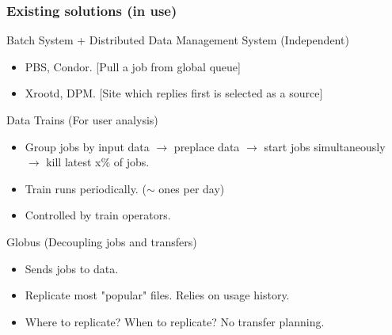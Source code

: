 \documentclass{beamer}
\begin{document}
\begin{frame}\frametitle{Existing solutions (in use)} 	
\begin{block}{Batch System + Distributed Data Management System (Independent)}  
		\begin{itemize}
			\item PBS, Condor. [Pull a job from global queue]
			\item Xrootd, DPM. [Site which replies first is selected as a source] 			
		\end{itemize}
 	\end{block} 	
\begin{block}{Data Trains (For user analysis)}	
	 \begin{itemize}
	 \item Group jobs by input data $\longrightarrow$ preplace data $\longrightarrow$ start jobs simultaneously $\longrightarrow$ kill latest x\% of jobs. 
	 \item Train runs periodically. ($\sim$ ones per day)  
 	 \item Controlled by train operators. 
 	  \end{itemize}
\end{block}
\begin{block}{Globus (Decoupling jobs and transfers)} 	
\begin{itemize}
 	 \item Sends jobs to data.  
 	 \item Replicate most "popular" files. Relies on usage history.
 	 \item Where to replicate? When to replicate? No transfer planning.
 	 \end{itemize}
\end{block} 	 
\end{frame}

\end{document}
